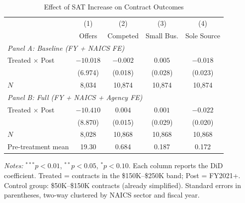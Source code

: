\begin{table}[H]
\centering
\caption{Effect of SAT Increase on Contract Outcomes}
\label{tab:main}
\begin{threeparttable}
\begin{tabular}{lcccc}
\toprule
 & (1) & (2) & (3) & (4) \\
 & Offers & Competed & Small Bus. & Sole Source \\
\midrule
\multicolumn{5}{l}{\textit{Panel A: Baseline (FY + NAICS FE)}} \\
Treated $\times$ Post & $-10.018$ & $-0.002$ & $0.005$ & $-0.018$ \\
 & (6.974) & (0.018) & (0.028) & (0.023) \\
$N$ & 8,034 & 10,874 & 10,874 & 10,874 \\
\midrule
\multicolumn{5}{l}{\textit{Panel B: Full (FY + NAICS + Agency FE)}} \\
Treated $\times$ Post & $-10.410$ & $0.004$ & $0.001$ & $-0.022$ \\
 & (8.870) & (0.015) & (0.029) & (0.020) \\
$N$ & 8,028 & 10,868 & 10,868 & 10,868 \\
Pre-treatment mean & 19.30 & 0.684 & 0.187 & 0.172 \\
\bottomrule
\end{tabular}
\begin{tablenotes}[flushleft]
\small
\item \textit{Notes:} $^{***}p<0.01$, $^{**}p<0.05$, $^{*}p<0.10$. Each column reports the DiD coefficient. Treated = contracts in the \$150K--\$250K band; Post = FY2021+. Control group: \$50K--\$150K contracts (already simplified). Standard errors in parentheses, two-way clustered by NAICS sector and fiscal year.
\end{tablenotes}
\end{threeparttable}
\end{table}

